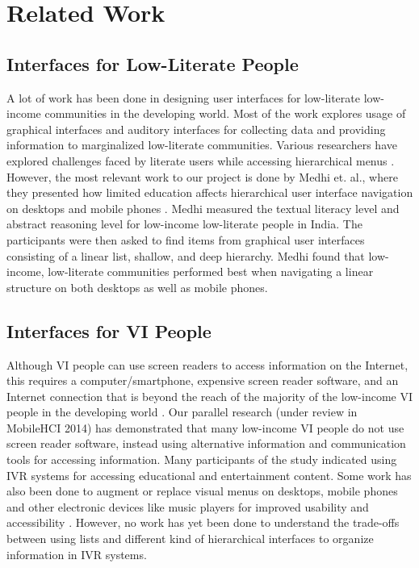 \documentclass{sigchi}
\begin{document}
\section{Related Work}

\subsection{Interfaces for Low-Literate People}
A lot of work has been done in designing user interfaces for low-literate low-income communities in the developing world. Most of the work explores usage of graphical interfaces \cite{Grisedale1997,Medhi2011a,Medhi2008,Ghosh2003} and auditory interfaces \cite{Cuendet2013,Agarwal2010,Mudliar2013} for collecting data and providing information to marginalized low-literate communities. Various researchers have explored challenges faced by literate users while accessing hierarchical menus \cite{Allen1983,Chaudry2012}. However, the most relevant work to our project is done by Medhi et. al., where they presented how limited education affects hierarchical user interface navigation on desktops and mobile phones \cite{Medhi2013a,Medhi2013b}. Medhi measured the textual literacy level and abstract reasoning level for low-income low-literate people in India. The participants were then asked to find items from graphical user interfaces consisting of a linear list, shallow, and deep hierarchy. Medhi found that low-income, low-literate communities performed best when navigating a linear structure on both desktops as well as mobile phones.

\subsection{Interfaces for VI People}
Although VI people can use screen readers to access information on the Internet, this requires a computer/smartphone, expensive screen reader software, and an Internet connection that is beyond the reach of the majority of the low-income VI people in the developing world \cite{McCarthy2012}. Our parallel research (under review in MobileHCI 2014) has demonstrated that many low-income VI people do not use screen reader software, instead using alternative information and communication tools for accessing information. Many participants of the study indicated using IVR systems for accessing educational and entertainment content. Some work has also been done to augment or replace visual menus on desktops, mobile phones and other electronic devices like music players for improved usability and accessibility \cite{Yalla2008,Zhao2007,Jeon2012}. However, no work has yet been done to understand the trade-offs between using lists and different kind of hierarchical interfaces to organize information in IVR systems.
\end{document}
